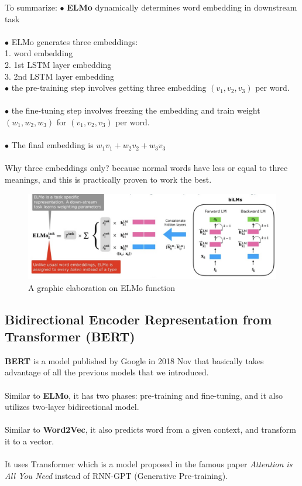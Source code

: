 \documentclass[paper=a4, fontsize=12pt]{scrartcl}
\begin{document}
To summarize:
$\bullet$ \textbf{ELMo} dynamically determines word embedding in downstream task \\\\
$\bullet$ ELMo generates three embeddings: \\
1. word embedding \\
2. 1st LSTM layer embedding \\
3. 2nd LSTM layer embedding \\
$\bullet$ the pre-training step involves getting three embedding $(v_1, v_2, v_3)$ per word. \\\\
$\bullet$ the fine-tuning step involves freezing the embedding and train weight $(w_1, w_2, w_3)$ for $(v_1, v_2, v_3)$ per word. \\\\
$\bullet$ The final embedding is $w_1 v_1 + w_2 v_2 + w_3 v_3$\\\\
Why three embeddings only? because normal words have less or equal to three meanings, and this is practically proven to work the best. 
 \begin{figure}
  \includegraphics[scale=0.7]{elmofunction.png}
  \caption{A graphic elaboration on ELMo function}
  \label{fig:skip-gram}
\end{figure}
\subsection{Bidirectional Encoder Representation from Transformer (BERT)}
\textbf{BERT} is a model published by Google in 2018 Nov that basically takes advantage of all the previous models that we introduced. \\\\
Similar to \textbf{ELMo}, it has two phases: pre-training and fine-tuning, and it also utilizes two-layer bidirectional model. \\\\
Similar to \textbf{Word2Vec}, it also predicts word from a given context, and transform it to a vector.\\\\
It uses Transformer which is a model proposed in the famous paper \textit{Attention is All You Need} instead of RNN-GPT (Generative Pre-training).\\\\
\end{document}
